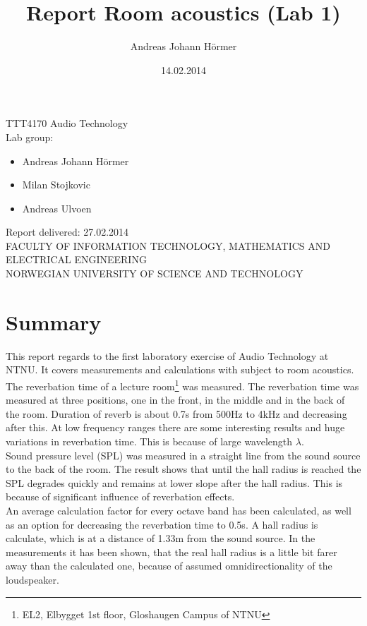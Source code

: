 \documentclass{article}
\title{Report Room acoustics (Lab 1)}
\author{Andreas Johann H\"ormer}
\date{14.02.2014}
\begin{document}
\thispagestyle{empty}
\maketitle
\thispagestyle{empty}
\begin{center}
TTT4170 Audio Technology\\[3cm]
Lab group:
\begin{itemize}
\item Andreas Johann H\"ormer
\item Milan Stojkovic
\item Andreas Ulvoen\\[3cm]
\end{itemize}
Report delivered: 27.02.2014\\[6cm]
FACULTY OF INFORMATION TECHNOLOGY, MATHEMATICS AND ELECTRICAL ENGINEERING\\
NORWEGIAN UNIVERSITY OF SCIENCE AND TECHNOLOGY
\end{center}
\thispagestyle{empty}
\tableofcontents
\thispagestyle{empty}
\newpage
\section*{Summary}
\thispagestyle{empty}
This report regards to the first laboratory exercise of Audio Technology at NTNU. It covers measurements and calculations with subject to room acoustics.\\
The reverbation time of a lecture room\footnote{EL2, Elbygget 1st floor, Gloshaugen Campus of NTNU} was measured. The reverbation time was measured at three positions, one in the front, in the middle and in the back of the room. Duration of reverb is about 0.7s from 500Hz to 4kHz and decreasing after this. At low frequency ranges there are some interesting results and huge variations in reverbation time. This is because of large wavelength $\lambda$.\\
Sound pressure level (SPL) was measured in a straight line from the sound source to the back of the room. The result shows that until the hall radius is reached the SPL degrades quickly and remains at lower slope after the hall radius. This is because of significant influence of reverbation effects.\\
An average calculation factor for every octave band has been calculated, as well as an option for decreasing the reverbation time to 0.5s. A hall radius is calculate, which is at a distance of 1.33m from the sound source. In the measurements it has been shown, that the real hall radius is a little bit farer away than the calculated one, because of assumed omnidirectionality of the loudspeaker.
\newpage
\setcounter{page}{1}
\end{document}
